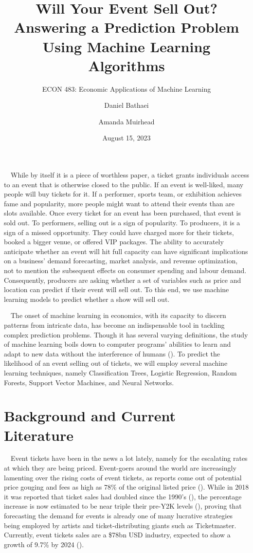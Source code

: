 \documentclass[
]{article}
\title{Will Your Event Sell Out? Answering a Prediction Problem Using
Machine Learning Algorithms}
\subtitle{ECON 483: Economic Applications of Machine Learning}
\author{Daniel Bathaei \and Amanda Muirhead}
\date{August 15, 2023}
\begin{document}
\maketitle

~~While by itself it is a piece of worthless paper, a ticket grants
individuals access to an event that is otherwise closed to the public.
If an event is well-liked, many people will buy tickets for it. If a
performer, sports team, or exhibition achieves fame and popularity, more
people might want to attend their events than are slots available. Once
every ticket for an event has been purchased, that event is sold out. To
performers, selling out is a sign of popularity. To producers, it is a
sign of a missed opportunity. They could have charged more for their
tickets, booked a bigger venue, or offered VIP packages. The ability to
accurately anticipate whether an event will hit full capacity can have
significant implications on a business' demand forecasting, market
analysis, and revenue optimization, not to mention the subsequent
effects on consumer spending and labour demand. Consequently, producers
are asking whether a set of variables such as price and location can
predict if their event will sell out. To this end, we use machine
learning models to predict whether a show will sell out.

~~The onset of machine learning in economics, with its capacity to
discern patterns from intricate data, has become an indispensable tool
in tackling complex prediction problems. Though it has several varying
definitions, the study of machine learning boils down to computer
programs' abilities to learn and adapt to new data without the
interference of humans (\citet{babenko2021}). To predict the likelihood
of an event selling out of tickets, we will employ several machine
learning techniques, namely Classification Trees, Logistic Regression,
Random Forests, Support Vector Machines, and Neural Networks.

\hypertarget{background-and-current-literature}{%
\section{Background and Current
Literature}\label{background-and-current-literature}}

~~Event tickets have been in the news a lot lately, namely for the
escalating rates at which they are being priced. Event-goers around the
world are increasingly lamenting over the rising costs of event tickets,
as reports come out of potential price gouging and fees as high as 78\%
of the original listed price (\citet{whyever2022}). While in 2018 it was
reported that ticket sales had doubled since the 1990's
(\citet{gigtick2018}), the percentage increase is now estimated to be
near triple their pre-Y2K levels (\citet{lastweektonight2022}), proving
that forecasting the demand for events is already one of many lucrative
strategies being employed by artists and ticket-distributing giants such
as Ticketmaster. Currently, event tickets sales are a \$78bn USD
industry, expected to show a growth of 9.7\% by 2024 (\citet{eventti}).
\end{document}
